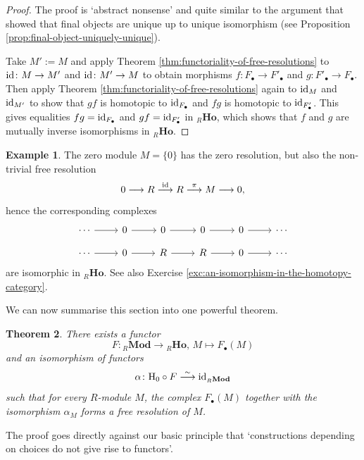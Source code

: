 \documentclass[11pt]{amsbook}
\newcommand{\longisomto}{\overset{\sim}{\longrightarrow}}
\newcommand{\longto}{\longrightarrow}
\DeclareMathOperator\Mod{{\bf{Mod}}}
\def\rH{{\mathrm H}} \def\rK{{\mathrm K}} \def\rR{{\mathrm R}}
\def\id{{\rm id}}
\def\Mod{\mathbf{Mod}}
\def\Ho{\mathbf{Ho}}
\theoremstyle{plain}
\newtheorem{theorem}{Theorem}
\theoremstyle{definition}
\newtheorem{example}[theorem]{Example}
\begin{document}
\begin{proof}
The proof is `abstract nonsense' and quite similar to the argument that showed that final objects are unique up to unique isomorphism (see Proposition \ref{prop:final-object-uniquely-unique}).

Take $M':=M$ and apply Theorem \ref{thm:functoriality-of-free-resolutions} to $\id\colon M\to M'$ and $\id\colon M'\to M$ to obtain morphisms $f\colon F_\bullet\to F'_\bullet$ and $g\colon F'_\bullet \to F_\bullet$. Then apply Theorem \ref{thm:functoriality-of-free-resolutions} again to $\id_M$ and $\id_{M'}$ to show that $gf$ is homotopic to $\id_{F_\bullet}$ and $fg$ is homotopic to $\id_{F'_\bullet}$. This gives equalities $fg=\id_{F_\bullet}$ and $gf=\id_{F'_\bullet}$ in ${}_R\Ho$, which shows that $f$ and $g$ are mutually inverse isomorphisms in ${}_R\Ho$.
\end{proof}

\begin{example}
The zero module $M=\{0\}$ has the zero resolution, but also the non-trivial free resolution
\[
	0 \longto R \overset{\id}{\longto} R \overset{\pi}{\longto} M \longto 0,
\]
hence the corresponding complexes 
\[
\begin{tikzcd}[row sep=small]
\cdots \arrow{r}
	& 0 \arrow{r}
	& 0 \arrow{r}
	& 0 \arrow{r}
	& 0 \arrow{r}
	&\cdots \\ 
\cdots \arrow{r}
	& 0 \arrow{r}
	& R \arrow{r}
	& R \arrow{r}
	& 0 \arrow{r}
	&\cdots
\end{tikzcd}
\]
are isomorphic in ${}_R\Ho$. See also Exercise \ref{exc:an-isomorphism-in-the-homotopy-category}.
\end{example}


We can now summarise this section into one powerful theorem.

\begin{theorem}\label{thm:free-resolution-functor}
There exists a functor
\[
	F\colon {}_R\Mod \to {}_R\Ho,\, M \mapsto F_\bullet(M)
\]
and an isomorphism of functors
\[
	\alpha\colon \rH_0 \circ F \longisomto \id_{{}_R\Mod}
\]
such that for every $R$-module $M$, the complex $F_\bullet(M)$ together with the isomorphism $\alpha_M$ forms a free resolution of $M$.
\end{theorem}

The proof goes directly against our basic principle that `constructions depending on choices do not give rise to functors'. 
\end{document}
